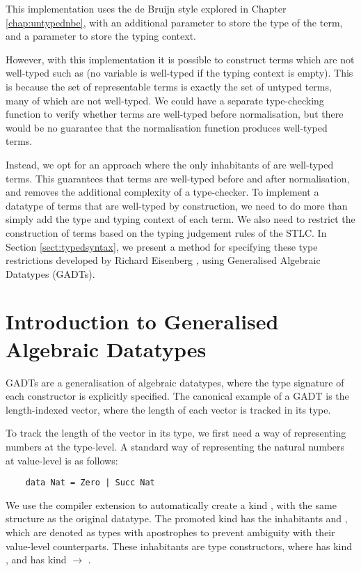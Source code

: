 This implementation uses the de Bruijn style explored in Chapter \ref{chap:untypednbe}, with an additional  parameter to store the type of the term, and a \code{[Ty]} parameter to store the typing context.


However, with this implementation it is possible to construct terms which are not well-typed such as  (no variable is well-typed if the typing context is empty). This is because the set of representable terms is exactly the set of untyped terms, many of which are not well-typed. We could have a separate type-checking function to verify whether terms are well-typed before normalisation, but there would be no guarantee that the normalisation function produces well-typed terms.

Instead, we opt for an approach where the only inhabitants of  are well-typed terms. This guarantees that terms are well-typed before and after normalisation, and removes the additional complexity of a type-checker. To implement a datatype of terms that are well-typed by construction, we need to do more than simply add the type and typing context of each term. We also need to restrict the construction of terms based on the typing judgement rules of the STLC. In Section \ref{sect:typedsyntax}, we present a method for specifying these type restrictions developed by Richard Eisenberg \cite{GADTs}, using Generalised Algebraic Datatypes (GADTs).

\section{Introduction to Generalised Algebraic Datatypes}

GADTs are a generalisation of algebraic datatypes, where the type signature of each constructor is explicitly specified. The canonical example of a GADT is the length-indexed vector, where the length of each vector is tracked in its type.

To track the length of the vector in its type, we first need a way of representing numbers at the type-level. A standard way of representing the natural numbers at value-level is as follows:

\begin{lstlisting}
    data Nat = Zero | Succ Nat
\end{lstlisting}

We use the  compiler extension to automatically create a kind , with the same structure as the original  datatype. The promoted kind  has the inhabitants  and , which are denoted as types with apostrophes to prevent ambiguity with their value-level counterparts. These inhabitants are type constructors, where  has kind , and  has kind  $\rightarrow$ . 

